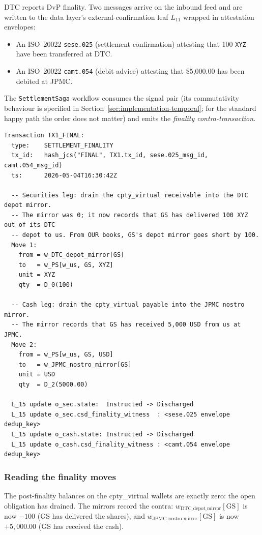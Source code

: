 \documentclass[11pt,a4paper]{article}
\begin{document}
DTC reports DvP finality. Two messages arrive on the inbound feed and are written to the data layer's external-confirmation leaf $L_{11}$ wrapped in attestation envelopes:

\begin{itemize}[nosep]
\item An ISO~20022 \texttt{sese.025} (settlement confirmation) attesting that 100 \texttt{XYZ} have been transferred at DTC.
\item An ISO~20022 \texttt{camt.054} (debit advice) attesting that \$5{,}000.00 has been debited at JPMC.
\end{itemize}

The \texttt{SettlementSaga} workflow consumes the signal pair (its commutativity behaviour is specified in Section~\ref{sec:implementation-temporal}; for the standard happy path the order does not matter) and emits the \emph{finality contra-transaction}.

\begin{lstlisting}
Transaction TX1_FINAL:
  type:    SETTLEMENT_FINALITY
  tx_id:   hash_jcs("FINAL", TX1.tx_id, sese.025_msg_id, camt.054_msg_id)
  ts:      2026-05-04T16:30:42Z

  -- Securities leg: drain the cpty_virtual receivable into the DTC depot mirror.
  -- The mirror was 0; it now records that GS has delivered 100 XYZ out of its DTC
  -- depot to us. From OUR books, GS's depot mirror goes short by 100.
  Move 1:
    from = w_DTC_depot_mirror[GS]
    to   = w_PS[w_us, GS, XYZ]
    unit = XYZ
    qty  = D_0(100)

  -- Cash leg: drain the cpty_virtual payable into the JPMC nostro mirror.
  -- The mirror records that GS has received 5,000 USD from us at JPMC.
  Move 2:
    from = w_PS[w_us, GS, USD]
    to   = w_JPMC_nostro_mirror[GS]
    unit = USD
    qty  = D_2(5000.00)

  L_15 update o_sec.state:  Instructed -> Discharged
  L_15 update o_sec.csd_finality_witness  : <sese.025 envelope dedup_key>
  L_15 update o_cash.state: Instructed -> Discharged
  L_15 update o_cash.csd_finality_witness : <camt.054 envelope dedup_key>
\end{lstlisting}

\subsubsection*{Reading the finality moves}

The post-finality balances on the cpty\_virtual wallets are exactly zero: the open obligation has drained. The mirrors record the contra: $w_{\mathrm{DTC\_depot\_mirror}}[\mathrm{GS}]$ is now $-100$ (GS has delivered the shares), and $w_{\mathrm{JPMC\_nostro\_mirror}}[\mathrm{GS}]$ is now $+5{,}000.00$ (GS has received the cash).
\end{document}

